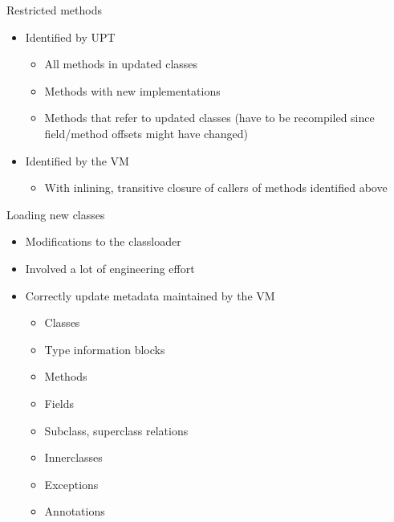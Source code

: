 \begin{frame}[t,fragile]{Restricted methods}%
\begin{itemize}
\item Identified by UPT
  \begin{itemize}
  \item All methods in updated classes
  \item Methods with new implementations
  \item Methods that refer to updated classes (have to be recompiled since
        field/method offsets might have changed)
  \end{itemize}
\item Identified by the VM
  \begin{itemize}
  \item With inlining, transitive closure of callers of methods identified
        above
  \end{itemize}
\end{itemize}
\end{frame}

{
\begin{frame}[t,fragile,label=classload]{Loading new classes}%
\begin{itemize}
\item Modifications to the classloader
\item Involved a lot of engineering effort
\item<2-> Correctly update metadata maintained by the VM
  \begin{itemize}
  \item Classes
  \item Type information blocks
  \item Methods
  \item Fields
  \item Subclass, superclass relations
  \item Innerclasses
  \item Exceptions
  \item Annotations
  \end{itemize}
\end{itemize}
\end{frame}
}

